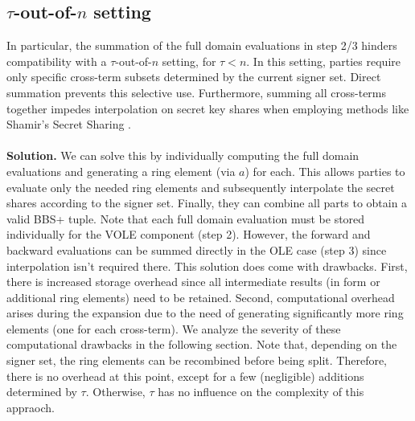 \subsection{$\tau$-out-of-$n$ setting}
In particular, the summation of the full domain evaluations in step 2/3 hinders compatibility with a $\tau$-out-of-$n$ setting, for $\tau < n$. In this setting, parties require only specific cross-term subsets determined by the current signer set. Direct summation prevents this selective use. Furthermore, summing all cross-terms together impedes interpolation on secret key shares when employing methods like Shamir's Secret Sharing \cite{shamir1979share}.  
\\\\
\textbf{Solution.} We can solve this by individually computing the full domain evaluations and generating a ring element (via $a$) for each. This allows parties to evaluate only the needed ring elements and subsequently interpolate the secret shares according to the signer set. Finally, they can combine all parts to obtain a valid BBS+ tuple. Note that each full domain evaluation must be stored individually for the VOLE component (step 2). However, the forward and backward evaluations can be summed directly in the OLE case (step 3) since interpolation isn't required there. This solution does come with drawbacks. First, there is increased storage overhead since all intermediate results (in form or additional ring elements) need to be retained. Second, computational overhead arises during the expansion due to the need of generating significantly more ring elements (one for each cross-term). We analyze the severity of these computational drawbacks in the following section. Note that, depending on the signer set, the ring elements can be recombined before being split. Therefore, there is no overhead at this point, except for a few (negligible) additions determined by $\tau$. Otherwise, $\tau$ has no influence on the complexity of this appraoch.

